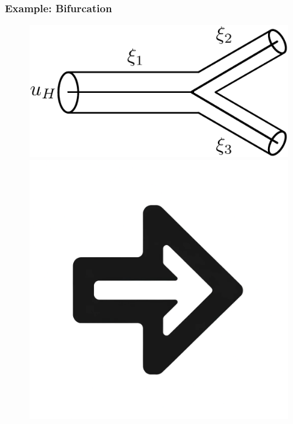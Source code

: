 \documentclass[compress]{beamer}
\begin{document}
\begin{frame}
	\frametitle{Example: Bifurcation}
	\begin{figure}
		\begin{center}
			\begin{minipage}[t][0.35\paperheight][t]{\textwidth}
				\begin{minipage}{0.44\textwidth}
					\includegraphics[width=\textwidth]{images/bifurcation.eps}
				\end{minipage}
				\hfill
				\begin{minipage}{0.09\textwidth}
					\includegraphics[width=\textwidth]{images/right_arrow.png}
				\end{minipage}
				\hfill
				\begin{minipage}{0.44\textwidth}

\end{minipage}
\end{minipage}
\end{center}
\end{figure}
\end{frame}
\end{document}
